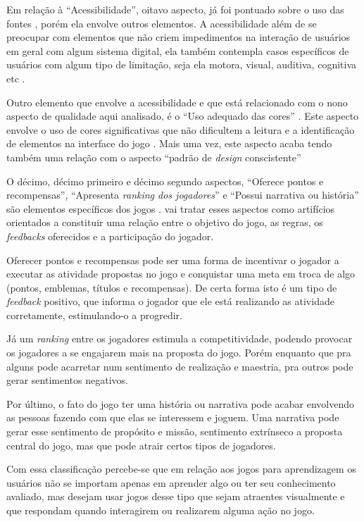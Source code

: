 Em relação à ``Acessibilidade'', oitavo aspecto, já foi pontuado sobre o uso das fontes \cite{Petri_Wangenheim_2019}, porém ela envolve outros elementos. A acessibilidade além de se preocupar com elementos que não criem impedimentos na interação de usuários em geral com algum sistema digital, ela também contempla casos específicos de usuários com algum tipo de limitação, seja ela motora, visual, auditiva, cognitiva etc \cite[p. 48]{BarbosaEtAl2021}.

Outro elemento que envolve a acessibilidade e que está relacionado com o nono aspecto de qualidade aqui analisado, é o ``Uso adequado das cores'' \cite{Petri_Wangenheim_2019}. Este aspecto envolve o uso de cores significativas que não dificultem a leitura e a identificação de elementos na interface do jogo \cite{silva_sales_mendes2021}. Mais uma vez, este aspecto acaba tendo também uma relação com o aspecto ``padrão de \textit{design} conscistente'' \cite{Petri_Wangenheim_2019} 

O décimo, décimo primeiro e décimo segundo aspectos, ``Oferece pontos e recompensas'', ``Apresenta \textit{ranking dos jogadores}'' e ``Possui narrativa ou história'' são elementos específicos dos jogos \cite{silva_sales_mendes2021}.  vai tratar esses aspectos como artifícios orientados a constituir uma relação entre o objetivo do jogo, as regras, os \textit{feedbacks} oferecidos e a participação do jogador.

Oferecer pontos e recompensas pode ser uma forma de incentivar o jogador a executar as atividade propostas no jogo e conquistar uma meta em troca de algo (pontos, emblemas, títulos e recompensas). De certa forma isto é um tipo de \textit{feedback} positivo, que informa o jogador que ele está realizando as atividade corretamente, estimulando-o a progredir.

Já um \textit{ranking} entre os jogadores estimula a competitividade, podendo provocar os jogadores a se engajarem mais na proposta do jogo. Porém enquanto que pra alguns pode acarretar num sentimento de realização e maestria, pra outros pode gerar sentimentos negativos.

Por último, o fato do jogo ter uma história ou narrativa pode acabar envolvendo as pessoas fazendo com que elas se interessem e joguem. Uma narrativa pode gerar esse sentimento de propósito e missão, sentimento extrínseco a proposta central do jogo, mas que pode atrair certos tipos de jogadores. 

Com essa classificação percebe-se que em relação aos jogos para aprendizagem os usuários não se importam apenas em aprender algo ou ter seu conhecimento avaliado, mas desejam usar jogos desse tipo que sejam atraentes visualmente e que respondam quando interagirem ou realizarem alguma ação no jogo.

